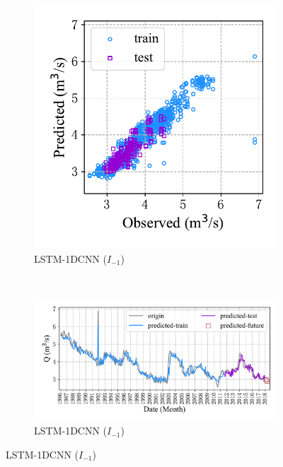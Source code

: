 \begin{figure}[!htbp]
  \centering
  \begin{subfigure}[b]{0.305\textwidth}
    \includegraphics[width=\textwidth]{Img/chap4_spr/out3/spr_scatter_in_1_out_3_lstm_cnn.pdf}
    \vspace{-1.2cm}
    \caption{LSTM-1DCNN ($I_{-1}$)}
    \label{fig:spr_scatter_in_1_out_3_lstm_cnn}
  \end{subfigure}
  ~
  \begin{subfigure}[b]{0.615\textwidth}
    \includegraphics[width=\textwidth]{Img/chap4_spr/out3/spr_series_in_1_out_3_lstm_cnn.pdf}
    \vspace{-1.2cm}
    \caption{LSTM-1DCNN ($I_{-1}$)}
    \label{fig:spr_series_in_1_out_3_lstm_cnn}

\end{subfigure}
\end{figure}

